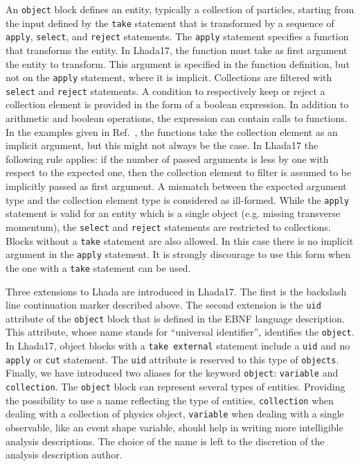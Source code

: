 \documentclass[11pt]{cernrep}
\begin{document}
An {\tt object} block defines an entity, typically a collection of particles, starting from the input defined by the {\tt take} statement that is transformed by a sequence of {\tt apply}, {\tt select}, and {\tt reject}  statements. The {\tt apply} statement specifies a function that transforms the entity. In {\sc Lhada17}, the function must take as first argument the entity to transform. This argument is specified in the function definition, but not on the {\tt apply} statement, where it is implicit. Collections are filtered with {\tt select} and {\tt reject} statements. A condition to respectively keep or reject a collection element is provided in the form of a boolean expression. In addition to arithmetic and boolean operations, the expression can contain calls to functions. In the examples given in Ref.~\cite{Brooijmans:2016vro}, the functions take the collection element as an implicit argument, but this might not always be the case. In {\sc Lhada17} the following rule applies: if the number of passed arguments is less by one with respect to the expected one, then the collection element to filter is assumed to be implicitly passed as first argument. A mismatch between the expected argument type and the collection element type is considered as ill-formed. While the {\tt apply} statement is valid for an entity which is a single object (e.g. missing transverse momentum), the {\tt select} and {\tt reject} statements are restricted to collections. Blocks without a {\tt take} statement are also allowed. In this case there is no implicit argument in the {\tt apply} statement. It is strongly discourage to use this form when the one with a {\tt take} statement can be used.

Three extensions to {\sc Lhada} are introduced in {\sc Lhada17}. The first is the backslash line continuation marker described above. The second extension is the {\tt uid} attribute of the {\tt object} block that is defined in the EBNF language description. This attribute, whose name stands for ``universal identifier'', identifies the {\tt object}. In {\sc Lhada17}, object blocks with a {\tt take external} statement include a {\tt uid} and no {\tt apply} or {\tt cut} statement. The {\tt uid} attribute is reserved to this type of {\tt objects}. Finally, we have introduced two aliases for the keyword {\tt object}: {\tt variable} and {\tt collection}. The {\tt object} block can represent several types of entities. Providing the possibility to use a name reflecting the type of entities, {\tt collection} when dealing with a collection of physics object, {\tt variable} when dealing with a single observable, like an event shape variable, should help in writing more intelligible analysis descriptions. The choice of the name is left to the discretion of the analysis description author.
\end{document}

